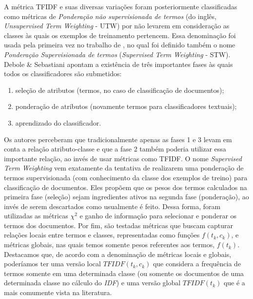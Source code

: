 A métrica \textsc{TFIDF} e suas diversas variações foram posteriormente classificadas como métricas de \textit{Ponderação não supervisionada de termos} (do inglês, \textit{Unsupervised Term Weighting} - \textsc{UTW}) por não levarem em consideração as classes às quais os exemplos de treinamento pertencem. Essa denominação foi usada pela primeira vez no trabalho de \cite{Debole03}, no qual foi definido também o nome \textit{Ponderação Supervisionada de termos} (\textit{Supervised Term Weighting} - \textsc{STW}). 
Debole \& Sebastiani apontam a existência de três importantes fases às quais todos os classificadores são submetidos: 
\begin{enumerate}
\item seleção de atributos (termos, no caso de classificação de documentos);
\item ponderação de atributos (novamente termos para classificadores textuais);
\item aprendizado do classificador.
\end{enumerate}
Os autores perceberam que tradicionalmente apenas as fases 1 e 3 levam em conta a relação atributo-classe e que a fase 2 também poderia utilizar essa importante relação, ao invés de usar métricas como \textsc{TFIDF}.
O nome \textit{Supervised Term Weighting} vem exatamente da tentativa de realizarem uma ponderação de termos supervisionada (com conhecimento da classe dos exemplos de treino) para classificação de documentos. Eles propõem que os pesos dos termos calculados na primeira fase (seleção) sejam ingredientes ativos na segunda fase (ponderação), ao invés de serem descartados como usualmente é feito. 
Dessa forma, foram utilizadas as métricas $\chi^2$ e ganho de informação para selecionar e ponderar os termos dos documentos.
Por fim, são testadas métricas que buscam capturar relações locais entre termos e classes, representadas como funções $f(t_k, c_k)$, e métricas globais, nas quais temos somente pesos referentes aos termos, $f(t_k)$. 
Destacamos que, de acordo com a denominação de métricas locais e globais, poderíamos ter uma versão local \textit{$TFIDF(t_k, c_k)$} que considera a frequência de termos somente em uma determinada classe (ou somente os documentos de uma determinada classe no cálculo do \textit{IDF}) e uma versão global \textit{$TFIDF(t_k)$} que é a mais comumente vista na literatura.


